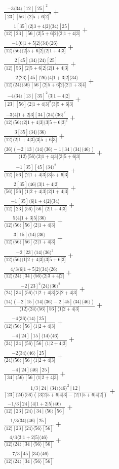 \documentclass[varwidth, border=5pt]{standalone}
\begin{document}
\begin{my}
$\begin{gathered}
\scriptscriptstyle\frac{-3⟨34⟩[12][25]^2}{[23][56]⟨2|5+6|2]^2}+\\
\scriptscriptstyle\frac{1[35]⟨2|3+4|2]⟨34⟩[25]}{⟨12⟩[23][56]⟨2|5+6|2]⟨2|1+4|3]}+\\
\scriptscriptstyle\frac{-1⟨6|1+5|2]⟨34⟩⟨26⟩}{⟨12⟩⟨56⟩⟨2|5+6|2]⟨2|1+4|3]}+\\
\scriptscriptstyle\frac{2[45]⟨34⟩⟨24⟩[25]}{⟨12⟩[56]⟨2|5+6|2]⟨2|1+4|3]}+\\
\scriptscriptstyle\frac{-2⟨23⟩[45]⟨26⟩⟨4|1+3|2]⟨34⟩}{⟨12⟩⟨24⟩⟨56⟩[56]⟨2|5+6|2]⟨2|1+3|4]}+\\
\scriptscriptstyle\frac{-4⟨34⟩[13][35]^2⟨3|1+4|2]}{[23][56]⟨2|1+4|3]^2⟨3|5+6|3]}+\\
\scriptscriptstyle\frac{-3⟨4|1+2|3][34]⟨34⟩⟨36⟩^2}{⟨12⟩⟨56⟩⟨2|1+4|3]⟨3|5+6|3]^2}+\\
\scriptscriptstyle\frac{3[35]⟨34⟩⟨36⟩}{⟨12⟩⟨2|1+4|3]⟨3|5+6|3]}+\\
\scriptscriptstyle\frac{⟨36⟩(-2[13]⟨14⟩⟨36⟩-1[34]⟨34⟩⟨46⟩)}{⟨12⟩⟨56⟩⟨2|1+4|3]⟨3|5+6|3]}+\\
\scriptscriptstyle\frac{-1[35][45]⟨34⟩^2}{⟨12⟩[56]⟨2|1+4|3]⟨3|5+6|3]}+\\
\scriptscriptstyle\frac{2[35]⟨46⟩⟨3|1+4|2]}{⟨56⟩[56]⟨1|2+4|3]⟨2|1+4|3]}+\\
\scriptscriptstyle\frac{-1[35]⟨6|1+4|2]⟨34⟩}{⟨12⟩[23]⟨56⟩[56]⟨2|1+4|3]}+\\
\scriptscriptstyle\frac{5⟨4|1+3|5]⟨36⟩}{⟨12⟩⟨56⟩[56]⟨2|1+4|3]}+\\
\scriptscriptstyle\frac{3[15]⟨14⟩⟨36⟩}{⟨12⟩⟨56⟩[56]⟨2|1+4|3]}+\\
\scriptscriptstyle\frac{-2[23]⟨14⟩⟨36⟩^2}{⟨12⟩⟨56⟩⟨1|2+4|3]⟨3|5+6|3]}+\\
\scriptscriptstyle\frac{4/3⟨6|1+5|2]⟨34⟩⟨26⟩}{⟨12⟩⟨24⟩[34]⟨56⟩⟨2|3+4|2]}+\\
\scriptscriptstyle\frac{-2[23]^2⟨24⟩⟨36⟩^2}{⟨24⟩[34]⟨56⟩⟨1|2+4|3]⟨3|2+4|3]}+\\
\scriptscriptstyle\frac{⟨14⟩(-2[15]⟨14⟩⟨36⟩-2[45]⟨34⟩⟨46⟩)}{⟨12⟩⟨24⟩⟨56⟩[56]⟨1|2+4|3]}+\\
\scriptscriptstyle\frac{-4⟨36⟩⟨14⟩[25]}{⟨12⟩⟨56⟩[56]⟨1|2+4|3]}+\\
\scriptscriptstyle\frac{-4[24][15]⟨14⟩⟨46⟩}{⟨24⟩[34]⟨56⟩[56]⟨1|2+4|3]}+\\
\scriptscriptstyle\frac{-2⟨34⟩⟨46⟩[25]}{⟨24⟩⟨56⟩[56]⟨1|2+4|3]}+\\
\scriptscriptstyle\frac{-4[24]⟨46⟩[25]}{[34]⟨56⟩[56]⟨1|2+4|3]}+\\
\scriptscriptstyle\frac{1/3[24]⟨34⟩⟨46⟩^2[12]}{[23]⟨24⟩⟨56⟩(⟨3|2|5+6|4|3]-⟨2|1|5+6|4|2])}+\\
\scriptscriptstyle\frac{-1/3[24]⟨4|1+2|5]⟨46⟩}{⟨12⟩[23]⟨24⟩[34]⟨56⟩[56]}+\\
\scriptscriptstyle\frac{1/3⟨34⟩⟨46⟩[25]}{⟨12⟩[23]⟨24⟩⟨56⟩[56]}+\\
\scriptscriptstyle\frac{4/3⟨3|1+2|5]⟨46⟩}{⟨12⟩⟨24⟩[34]⟨56⟩[56]}+\\
\scriptscriptstyle\frac{-7/3[45]⟨34⟩⟨46⟩}{⟨12⟩⟨24⟩[34]⟨56⟩[56]}\phantom{+}
\end{gathered}$
\end{my}
\end{document}
